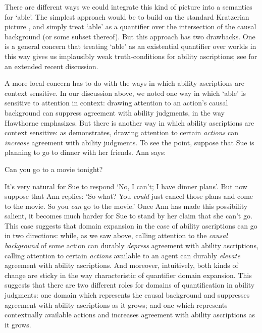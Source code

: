 \documentclass{salt}
\begin{document}
There are different ways we could integrate this kind of picture into a semantics for `able'. The simplest approach would be to build on the standard Kratzerian picture \citep{Kratzer1977,Kratzer:1981}, and simply treat `able' as a quantifier over the intersection of the causal background (or some subset thereof). But this approach has two drawbacks. One is a general concern that treating `able' as an existential quantifier over worlds in this way gives us implausibly weak truth-conditions for ability ascriptions; see \citealt{Mandelkern:2017b} for an extended recent discussion. 

A more local concern has to do with the ways in which ability ascriptions are context sensitive. In our discussion above, we noted one way in which `able' is sensitive to attention in context: drawing attention to an action's causal background can suppress agreement with ability judgments, in the way Hawthorne emphasizes. But there is another way in which ability ascriptions are context sensitive: as \citet{Mandelkern:2017b} demonstrates, drawing attention to certain \emph{actions} can \emph{increase} agreement with ability judgments. To see the point, suppose that Sue is planning to go to dinner with her friends. Ann says: 

\begin{exe}\ex Can you go to a movie tonight?\label{ann1}\end{exe}

\noindent  It's very natural for Sue to respond `No, I can't; I have dinner plans'. But now suppose that Ann replies: `So what? You \emph{could} just cancel those plans and come to the movie. So you \emph{can} go to the movie.' Once Ann has made this possibility salient, it becomes much harder for Sue to stand by her claim that she can't go. This case suggests that domain expansion in the case of ability ascriptions can go in two directions: while, as we saw above, calling attention to the \emph{causal background} of some action can durably \emph{depress} agreement with ability ascriptions, calling attention to certain  \emph{actions} available to an agent can durably \emph{elevate} agreement with ability ascriptions. And moreover, intuitively, both kinds of change are sticky in the way characteristic of quantifier domain expansion. This suggests that there are two different roles for domains of quantification in ability judgments: one domain which represents the causal background and suppresses agreement with ability ascriptions as it grows; and one which represents contextually available actions and increases agreement with ability ascriptions as it grows. 
\end{document}
